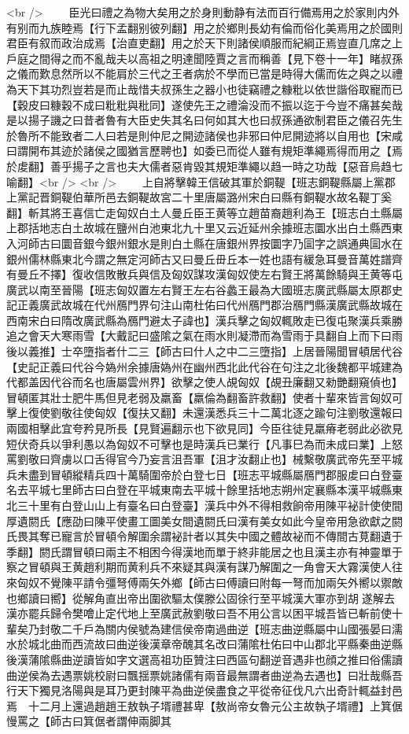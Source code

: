 <br />
　　臣光曰禮之為物大矣用之於身則動静有法而百行備焉用之於家則内外有别而九族睦焉【行下孟翻别彼列翻】用之於鄉則長幼有倫而俗化美焉用之於國則君臣有叙而政治成焉【治直吏翻】用之於天下則諸侯順服而紀綱正焉豈直几席之上戶庭之間得之而不亂哉夫以高祖之明達聞陸賈之言而稱善【見下卷十一年】睹叔孫之儀而歎息然所以不能肩於三代之王者病於不學而已當是時得大儒而佐之與之以禮為天下其功烈豈若是而止哉惜夫叔孫生之器小也徒竊禮之糠粃以依世諧俗取寵而已【穀皮曰糠穀不成曰粃粃與秕同】遂使先王之禮淪没而不振以迄于今豈不痛甚矣哉是以揚子譏之曰昔者魯有大臣史失其名曰何如其大也曰叔孫通欲制君臣之儀召先生於魯所不能致者二人曰若是則仲尼之開迹諸侯也非邪曰仲尼開迹將以自用也【宋咸曰謂開布其迹於諸侯之國猶言歷聘也】如委已而從人雖有規矩準繩焉得而用之【焉於䖍翻】善乎揚子之言也夫大儒者惡肯毀其規矩準繩以趋一時之功哉【惡音烏趋七喻翻】<br />
<br />
　　上自將擊韓王信破其軍於銅鞮【班志銅鞮縣屬上黨郡上黨記晋銅鞮伯華所邑去銅鞮故宮二十里唐屬潞州宋白曰縣有銅鞮水故名鞮丁奚翻】斬其將王喜信亡走匈奴白土人曼丘臣王黄等立趙苗裔趙利為王【班志白土縣屬上郡括地志白土故城在鹽州白池東北九十里又云近延州余據班志圜水出白土縣西東入河師古曰圜音銀今銀州銀水是則白土縣在唐銀州界按圜字乃圁字之誤通典圁水在銀州儒林縣東北今謂之無定河師古又曰曼丘毌丘本一姓也語有緩急耳曼音萬姓譜齊有曼丘不擇】復收信敗散兵與信及匈奴謀攻漢匈奴使左右賢王將萬餘騎與王黄等屯廣武以南至晉陽【班志匈奴置左右賢王左右谷蠡王最為大國班志廣武縣屬太原郡史記正義廣武故城在代州鴈門界句注山南杜佑曰代州鴈門郡治鴈門縣漢廣武縣故城在西南宋白曰隋改廣武縣為鴈門避太子諱也】漢兵擊之匈奴輒敗走已復屯聚漢兵乘勝追之會天大寒雨雪【大戴記曰盛隂之氣在雨水則凝滯而為雪雨于具翻自上而下曰雨後以義推】士卒墮指者什二三【師古曰什人之中二三墮指】上居晉陽聞冒頓居代谷【史記正義曰代谷今媯州余據唐媯州在幽州西北此代谷在句注之北後魏都平城建為代都盖因代谷而名也唐屬雲州界】欲擊之使人覘匈奴【覘丑廉翻又勑艷翻窺偵也】冒頓匿其壯士肥牛馬但見老弱及羸畜【羸倫為翻畜許救翻】使者十輩來皆言匈奴可擊上復使劉敬往使匈奴【復扶又翻】未還漢悉兵三十二萬北逐之踰句注劉敬還報曰兩國相擊此宜夸矜見所長【見賢遍翻示也下欲見同】今臣往徒見羸瘠老弱此必欲見短伏奇兵以爭利愚以為匈奴不可擊也是時漢兵已業行【凡事巳為而未成曰業】上怒罵劉敬曰齊虜以口舌得官今乃妄言沮吾軍【沮才汝翻止也】械繫敬廣武帝先至平城兵未盡到冒頓縱精兵四十萬騎圍帝於白登七日【班志平城縣屬鴈門郡服䖍曰白登臺名去平城七里師古曰白登在平城東南去平城十餘里括地志朔州定襄縣本漢平城縣東北三十里有白登山山上有臺名曰白登臺】漢兵中外不得相救餉帝用陳平袐計使使間厚遺閼氏【應劭曰陳平使畫工圖美女間遺閼氏曰漢有美女如此今皇帝用急欲獻之閼氏畏其奪已寵言於冒頓令解圍余謂袐計者以其失中國之體故袐而不傳間古莧翻遺于季翻】閼氏謂冒頓曰兩主不相困今得漢地而單于終非能居之也且漢主亦有神靈單于察之冒頓與王黄趙利期而黄利兵不來疑其與漢有謀乃解圍之一角會天大霧漢使人往來匈奴不覺陳平請令彊弩傅兩矢外鄉【師古曰傅讀曰附每一弩而加兩矢外嚮以禦敵也鄉讀曰嚮】從解角直出帝出圍欲驅太僕滕公固徐行至平城漢大軍亦到胡遂解去漢亦罷兵歸令樊噲止定代地上至廣武赦劉敬曰吾不用公言以困平城吾皆已斬前使十輩矣乃封敬二千戶為關内侯號為建信侯帝南過曲逆【班志曲逆縣屬中山國張晏曰濡水於城北曲而西流故曰曲逆後漢章帝醜其名改曰蒲隂杜佑曰中山郡北平縣秦曲逆縣後漢蒲隂縣曲逆讀皆如字文選高祖功臣贊注曰西區句翻逆音遇非也顔之推曰俗儒讀曲逆侯為去遇票姚校尉曰飄揺票姚諸儒有兩音最無謂者曲逆為去遇也】曰壯哉縣吾行天下獨見洛陽與是耳乃更封陳平為曲逆侯盡食之平從帝征伐凡六出奇計輒益封邑焉　十二月上還過趙趙王敖執子壻禮甚卑【敖尚帝女魯元公主故執子壻禮】上箕倨慢罵之【師古曰箕倨者謂伸兩脚其